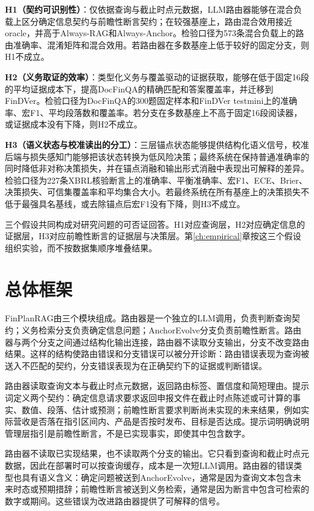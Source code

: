 \textbf{H1（契约可识别性）}：仅依据查询与截止时点元数据，LLM路由器能够在混合负载上区分确定信息契约与前瞻性断言契约；在较强基座上，路由混合效用接近oracle，并高于Always-RAG和Always-Anchor。检验口径为573条混合负载上的路由准确率、混淆矩阵和混合效用。若路由器在多数基座上低于较好的固定分支，则H1不成立。

\textbf{H2（义务取证的效率）}：类型化义务与覆盖驱动的证据获取，能够在低于固定16段的平均证据成本下，提高DocFinQA的精确匹配和答案覆盖率，并迁移到FinDVer。检验口径为DocFinQA的300题固定样本和FinDVer testmini上的准确率、宏F1、平均段落数和覆盖率。若分支在多数基座上不高于固定16段阅读器，或证据成本没有下降，则H2不成立。

\textbf{H3（语义状态与校准读出的分工）}：三层锚点状态能够提供结构化语义信号，校准后端与损失感知门能够把该状态转换为低风险决策；最终系统在保持普通准确率的同时降低非对称决策损失，并在锚点消融和输出形式消融中表现出可解释的差异。检验口径为227条XBRL核验断言上的准确率、平衡准确率、宏F1、ECE、Brier、决策损失、可信集覆盖率和平均集合大小。若最终系统在所有基座上的决策损失不低于最强具名基线，或去除锚点后宏F1没有下降，则H3不成立。

三个假设共同构成对研究问题的可否证回答。H1对应查询层，H2对应确定信息的证据层，H3对应前瞻性断言的证据层与决策层。第\ref{ch:empirical}章按这三个假设组织实验，而不按数据集顺序堆叠结果。

\section{总体框架}

FinPlanRAG由三个模块组成。路由器是一个独立的LLM调用，负责判断查询契约；义务检索分支负责确定信息问题；AnchorEvolve分支负责前瞻性断言。路由器与两个分支之间通过结构化输出连接，路由器不读取分支输出，分支不改变路由结果。这样的结构使路由错误和分支错误可以被分开诊断：路由错误表现为查询被送入不匹配的契约，分支错误表现为在正确契约下的证据或判断错误。

路由器读取查询文本与截止时点元数据，返回路由标签、置信度和简短理由。提示词定义两个契约：确定信息请求要求返回申报文件在截止时点陈述或可计算的事实、数值、段落、估计或预测；前瞻性断言要求判断尚未实现的未来结果，例如实际营收是否落在指引区间内、产品是否按时发布、目标是否达成。提示词明确说明管理层指引是前瞻性断言，不是已实现事实，即使其中包含数字。

路由器不读取已实现结果，也不读取两个分支的输出。它只看到查询和截止时点元数据，因此在部署时可以按查询缓存，成本是一次短LLM调用。路由器的错误类型也具有语义含义：确定问题被送到AnchorEvolve，通常是因为查询文本包含未来时态或预期措辞；前瞻性断言被送到义务检索，通常是因为断言中包含可检索的数字或期间。这些错误为改进路由器提供了可解释的信号。

